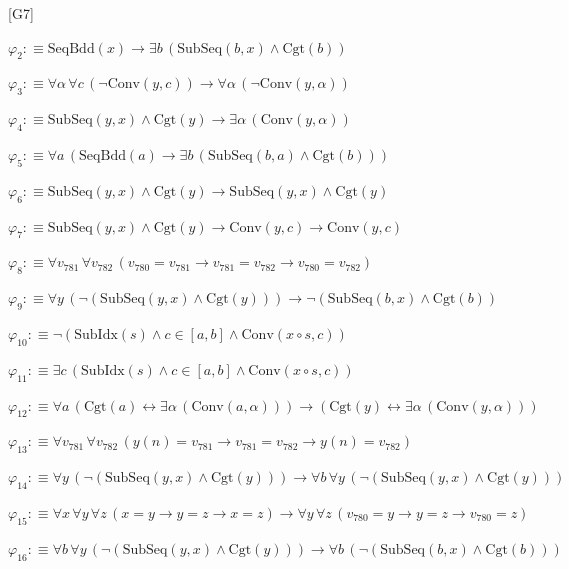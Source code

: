 \begin{fullproof}{[G7]}
\begin{abbrevlist}
\item $\varphi_{2} :\equiv \mathrm{SeqBdd}(x) \to \exists b\,(\mathrm{SubSeq}(b,x) \land \mathrm{Cgt}(b))$
\item $\varphi_{3} :\equiv \forall \alpha\,\forall c\,(\neg \mathrm{Conv}(y,c)) \to \forall \alpha\,(\neg \mathrm{Conv}(y,\alpha))$
\item $\varphi_{4} :\equiv \mathrm{SubSeq}(y,x) \land \mathrm{Cgt}(y) \to \exists \alpha\,(\mathrm{Conv}(y,\alpha))$
\item $\varphi_{5} :\equiv \forall a\,(\mathrm{SeqBdd}(a) \to \exists b\,(\mathrm{SubSeq}(b,a) \land \mathrm{Cgt}(b)))$
\item $\varphi_{6} :\equiv \mathrm{SubSeq}(y,x) \land \mathrm{Cgt}(y) \to \mathrm{SubSeq}(y,x) \land \mathrm{Cgt}(y)$
\item $\varphi_{7} :\equiv \mathrm{SubSeq}(y,x) \land \mathrm{Cgt}(y) \to \mathrm{Conv}(y,c) \to \mathrm{Conv}(y,c)$
\item $\varphi_{8} :\equiv \forall v_{781}\,\forall v_{782}\,(v_{780} = v_{781} \to v_{781} = v_{782} \to v_{780} = v_{782})$
\item $\varphi_{9} :\equiv \forall y\,(\neg (\mathrm{SubSeq}(y,x) \land \mathrm{Cgt}(y))) \to \neg (\mathrm{SubSeq}(b,x) \land \mathrm{Cgt}(b))$
\item $\varphi_{10} :\equiv \neg (\mathrm{SubIdx}(s) \land c \in [a,b] \land \mathrm{Conv}(x \circ s,c))$
\item $\varphi_{11} :\equiv \exists c\,(\mathrm{SubIdx}(s) \land c \in [a,b] \land \mathrm{Conv}(x \circ s,c))$
\item $\varphi_{12} :\equiv \forall a\,(\mathrm{Cgt}(a) \leftrightarrow \exists \alpha\,(\mathrm{Conv}(a,\alpha))) \to (\mathrm{Cgt}(y) \leftrightarrow \exists \alpha\,(\mathrm{Conv}(y,\alpha)))$
\item $\varphi_{13} :\equiv \forall v_{781}\,\forall v_{782}\,(y(n) = v_{781} \to v_{781} = v_{782} \to y(n) = v_{782})$
\item $\varphi_{14} :\equiv \forall y\,(\neg (\mathrm{SubSeq}(y,x) \land \mathrm{Cgt}(y))) \to \forall b\,\forall y\,(\neg (\mathrm{SubSeq}(y,x) \land \mathrm{Cgt}(y)))$
\item $\varphi_{15} :\equiv \forall x\,\forall y\,\forall z\,(x = y \to y = z \to x = z) \to \forall y\,\forall z\,(v_{780} = y \to y = z \to v_{780} = z)$
\item $\varphi_{16} :\equiv \forall b\,\forall y\,(\neg (\mathrm{SubSeq}(y,x) \land \mathrm{Cgt}(y))) \to \forall b\,(\neg (\mathrm{SubSeq}(b,x) \land \mathrm{Cgt}(b)))$

\end{abbrevlist}
\end{fullproof}
